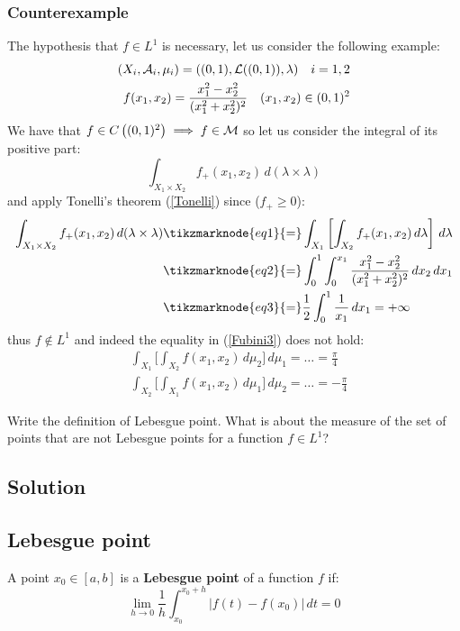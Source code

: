 \subsubsection{Counterexample}
The hypothesis that $f \in L^1$ is necessary, let us consider the following example: \\
\begin{align*}
    (X_i, \mathcal{A}_i, \mu_i) = ( (0,1), \mathcal{L}((0,1)), \lambda) \quad i=1,2 \\
    f(x_1, x_2) = \frac{x_1^2 - x_2^2}{(x_1^2+x_2^2)^2} \quad (x_1,x_2) \in (0,1)^2
\end{align*}
We have that $f \in C\left( (0,1)^2 \right) \implies f \in \mathcal{M}$ so let us consider the integral of its positive part:
\[
    \int_{X_1 \times X_2} f_+ (x_1, x_2) \, d(\lambda \times \lambda)    
\]
\newpage %
and apply Tonelli's theorem (\ref{Tonelli}) since ($f_+\geq 0$):
\begin{align*}
    \int_{X_1 \times X_2} f_+ (x_1, x_2) \, d(\lambda \times \lambda) & \tikzmarknode{eq1}{=} \int_{X_1} \left[ \int_{X_2} f_+(x_1,x_2) \, d\lambda \right] \, d\lambda \\
    & \tikzmarknode{eq2}{=} \int_0^1 \int_0^{x_1} \frac{x_1^2 - x_2^2}{(x_1^2+x_2^2)^2} \, dx_2 \, dx_1 \\
    & \tikzmarknode{eq3}{=} \frac{1}{2} \int_0^1 \frac{1}{x_1} \, dx_1 = + \infty
\end{align*} 
thus $f\notin L^1$ and indeed the equality in (\ref{Fubini3}) does not hold:
\begin{align*}
    & \int_{X_1} \biggl[ \int_{X_2} f(x_1,x_2) \, d\mu_2 \biggr] \, d\mu_1 = \dots = \frac{\pi}{4} \\
    & \int_{X_2}  \biggl[ \int_{X_1} f(x_1,x_2) \, d\mu_1 \biggr] \, d\mu_2 = \dots = -\frac{\pi}{4}
\end{align*}


\question
Write the definition of Lebesgue point. What is about the measure of the set of points that are not Lebesgue points for a function $f \in L^1$?

\subsection*{Solution}

\subsection{Lebesgue point}
A point $x_0 \in [a,b]$ is a \textbf{Lebesgue point} of a function $f$ if:
\[
    \lim_{h\to0} \frac{1}{h} \int_{x_0}^{x_0+h} |f(t)-f(x_0)| \, dt = 0
\]

